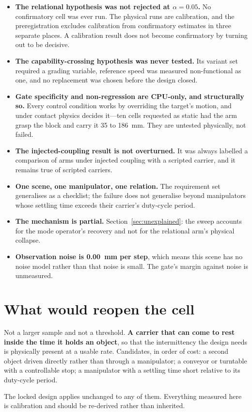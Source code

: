 \documentclass[10pt]{article}
\begin{document}
\begin{itemize}[leftmargin=*]
\item \textbf{The relational hypothesis was not rejected at \(\alpha = 0.05\).}
No confirmatory cell was ever run. The physical runs are calibration, and the
preregistration excludes calibration from confirmatory estimates in three
separate places. A calibration result does not become confirmatory by turning out
to be decisive.
\item \textbf{The capability-crossing hypothesis was never tested.} Its variant
set required a grading variable, reference speed was measured non-functional as
one, and no replacement was chosen before the design closed.
\item \textbf{Gate specificity and non-regression are CPU-only, and structurally
so.} Every control condition works by overriding the target's motion, and under
contact physics decides it---ten cells requested as static had the arm grasp the
block and carry it 35 to 186~mm. They are untested physically, not failed.
\item \textbf{The injected-coupling result is not overturned.} It was always
labelled a comparison of arms under injected coupling with a scripted carrier,
and it remains true of scripted carriers.
\item \textbf{One scene, one manipulator, one relation.} The requirement set
generalises as a checklist; the failure does not generalise beyond manipulators
whose settling time exceeds their carrier's duty-cycle period.
\item \textbf{The mechanism is partial.} Section~\ref{sec:unexplained}: the sweep
accounts for the mode operator's recovery and not for the relational arm's
physical collapse.
\item \textbf{Observation noise is 0.00~mm per step}, which means this scene has
no noise model rather than that noise is small. The gate's margin against noise
is unmeasured.
\end{itemize}

\section{What would reopen the cell}

Not a larger sample and not a threshold. \textbf{A carrier that can come to rest
inside the time it holds an object}, so that the intermittency the design needs
is physically present at a usable rate. Candidates, in order of cost: a second
object driven directly rather than through a manipulator; a conveyor or turntable
with a controllable stop; a manipulator with a settling time short relative to
its duty-cycle period.

The locked design applies unchanged to any of them. Everything measured here is
calibration and should be re-derived rather than inherited.



\end{document}
